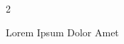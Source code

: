 \documentclass[10pt,a4paper,twoside]{article}
\begin{document}
\begin{multicols}{2}

Lorem Ipsum Dolor Amet
\end{multicols}
\end{document}
